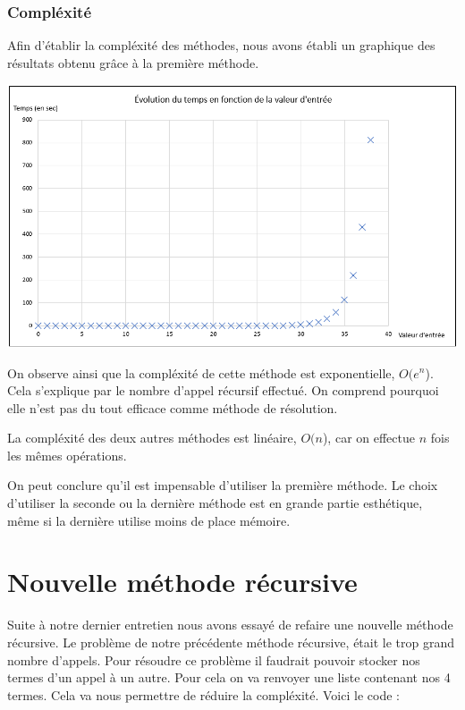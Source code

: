 \documentclass{article}
\newcommand{\code}[1]{}
\begin{document}
\section{Compléxité}

Afin d'établir la compléxité des méthodes, nous avons établi un graphique des résultats obtenu grâce à la première méthode.

\bigbreak
\begin{center}
\includegraphics[scale = 0.5]{Images/graphique.png}
\end{center}
\bigbreak

On observe ainsi que la compléxité de cette méthode est exponentielle, $ O(e^n$). Cela s'explique par le nombre d'appel récursif effectué. On comprend pourquoi elle n'est pas du tout efficace comme méthode de résolution.

La compléxité des deux autres méthodes est linéaire, $O(n$), car on effectue $n$ fois les mêmes opérations.

On peut conclure qu'il est impensable d'utiliser la première méthode. Le choix d'utiliser la seconde ou la dernière méthode est en grande partie esthétique, même si la dernière utilise moins de place mémoire.

\newpage
\part{Nouvelle méthode récursive}

Suite à notre dernier entretien nous avons essayé de refaire une nouvelle méthode récursive. Le problème de notre précédente méthode récursive, était le trop grand nombre d'appels. Pour résoudre ce problème il faudrait pouvoir stocker nos termes d'un appel à un autre. Pour cela on va renvoyer une liste contenant nos 4 termes. Cela va nous permettre de réduire la compléxité. Voici le code : 
\bigbreak
\code{Algos/Problem117_4.py}
\bigbreak
\end{document}

